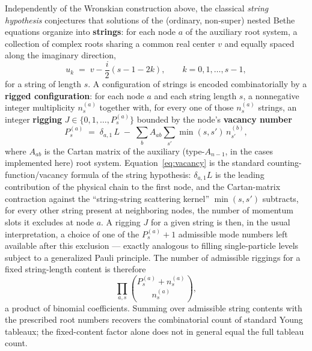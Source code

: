 \documentclass[11pt]{article}
\begin{document}
Independently of the Wronskian construction above, the classical
\emph{string hypothesis} conjectures that solutions of the (ordinary,
non-super) nested Bethe equations organize into \textbf{strings}: for each
node $a$ of the auxiliary root system, a collection of complex roots
sharing a common real center $v$ and equally spaced along the imaginary
direction,
\begin{equation}
  \label{eq:string}
  u_k \;=\; v - \frac{i}{2}(s-1-2k), \qquad k=0,1,\dots,s-1,
\end{equation}
for a string of length $s$. A configuration of strings is encoded
combinatorially by a \textbf{rigged configuration}: for each node $a$ and
each string length $s$, a nonnegative integer multiplicity
$n^{(a)}_s$ together with, for every one of those $n^{(a)}_s$ strings, an
integer \textbf{rigging} $J\in\{0,1,\dots,P^{(a)}_s\}$ bounded by the
node's \textbf{vacancy number}
\begin{equation}
  \label{eq:vacancy}
  P^{(a)}_s \;=\; \delta_{a,1}\,L \;-\; \sum_{b} A_{ab}\sum_{s'} \min(s,s')\, n^{(b)}_{s'},
\end{equation}
where $A_{ab}$ is the Cartan matrix of the auxiliary (type-$A_{n-1}$, in
the cases implemented here) root system. Equation~\eqref{eq:vacancy} is
the standard counting-function/vacancy formula of the string hypothesis:
$\delta_{a,1}L$ is the leading contribution of the physical chain to the
first node, and the Cartan-matrix contraction against the ``string-string
scattering kernel'' $\min(s,s')$ subtracts, for every other string present
at neighboring nodes, the number of momentum slots it excludes at node
$a$. A rigging $J$ for a given string is then, in the usual
interpretation, a choice of one of the $P^{(a)}_s+1$ admissible mode
numbers left available after this exclusion --- exactly analogous to
filling single-particle levels subject to a generalized Pauli principle.
The number of admissible riggings for a fixed string-length content is
therefore
\begin{equation}
  \label{eq:kostka-count}
  \prod_{a,s} \binom{P^{(a)}_s + n^{(a)}_s}{n^{(a)}_s},
\end{equation}
a product of binomial coefficients. Summing over admissible string
contents with the prescribed root numbers recovers the combinatorial
count of standard Young tableaux; the fixed-content factor alone does
not in general equal the full tableau count.
\end{document}

